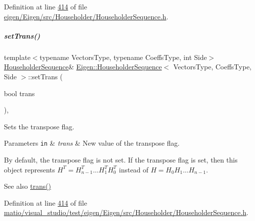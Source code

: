 Definition at line \hyperlink{eigen_2_eigen_2src_2_householder_2_householder_sequence_8h_source_l00414}{414} of file \hyperlink{eigen_2_eigen_2src_2_householder_2_householder_sequence_8h_source}{eigen/\+Eigen/src/\+Householder/\+Householder\+Sequence.\+h}.

\mbox{\label{group___householder___module_ab8a9c969a9adcd392c9d481d6e9ccaef}} 
\subparagraph{\texorpdfstring{set\+Trans()}{setTrans()}\hspace{0.1cm}{\footnotesize\ttfamily [2/2]}}
{\footnotesize\ttfamily template$<$typename Vectors\+Type, typename Coeffs\+Type, int Side$>$ \\
\hyperlink{group___householder___module_class_eigen_1_1_householder_sequence}{Householder\+Sequence}\& \hyperlink{group___householder___module_class_eigen_1_1_householder_sequence}{Eigen\+::\+Householder\+Sequence}$<$ Vectors\+Type, Coeffs\+Type, Side $>$\+::set\+Trans (\begin{DoxyParamCaption}\item[{bool}]{trans }\end{DoxyParamCaption})\hspace{0.3cm}{\ttfamily [inline]}, {\ttfamily [protected]}}



Sets the transpose flag. 


\begin{DoxyParams}[1]{Parameters}
\mbox{\tt in}  & {\em trans} & New value of the transpose flag.\\
\hline
\end{DoxyParams}
By default, the transpose flag is not set. If the transpose flag is set, then this object represents $ H^T = H_{n-1}^T \ldots H_1^T H_0^T $ instead of $ H = H_0 H_1 \ldots H_{n-1} $.

\begin{DoxySeeAlso}{See also}
\hyperlink{group___householder___module_ad61c9b10d95c26b7397ccb47f4d80b08}{trans()} 
\end{DoxySeeAlso}


Definition at line \hyperlink{matio_2visual__studio_2test_2eigen_2_eigen_2src_2_householder_2_householder_sequence_8h_source_l00414}{414} of file \hyperlink{matio_2visual__studio_2test_2eigen_2_eigen_2src_2_householder_2_householder_sequence_8h_source}{matio/visual\+\_\+studio/test/eigen/\+Eigen/src/\+Householder/\+Householder\+Sequence.\+h}.



